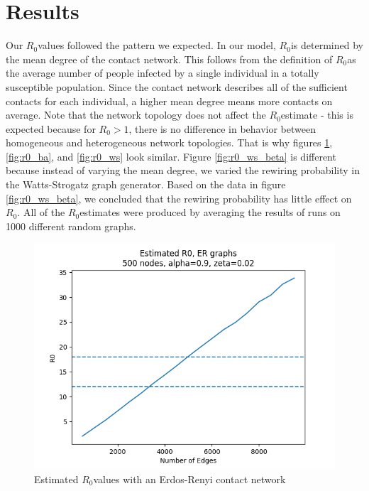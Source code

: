 \documentclass[conference]{IEEEtran}
\newcommand{\ro}{$R_0$}
\begin{document}
\section{Results} %
Our \ro values followed the pattern we expected. In our model, \ro is determined by the mean degree of the contact network. This follows from the definition of \ro as the average number of people infected by a single individual in a totally susceptible population. Since the contact network describes all of the sufficient contacts for each individual, a higher mean degree means more contacts on average. Note that the network topology does not affect the \ro estimate - this is expected because for $R_0 > 1$, there is no difference in behavior between homogeneous and heterogeneous network topologies.\cite{Pastor_satorras2014} That is why figures \ref{fig:r0_er}, \ref{fig:r0_ba}, and \ref{fig:r0_ws} look similar. Figure \ref{fig:r0_ws_beta} is different because instead of varying the mean degree, we varied the rewiring probability in the Watts-Strogatz graph generator. Based on the data in figure \ref{fig:r0_ws_beta}, we concluded that the rewiring probability has little effect on \ro. All of the \ro estimates were produced by averaging the results of runs on 1000 different random graphs.

\begin{figure}[t]
    \centering
    \includegraphics[scale=0.5]{images/est_r0_er.png}
    \caption{Estimated \ro values with an Erdos-Renyi contact network}
    \label{fig:r0_er}
\end{figure}
\end{document}
